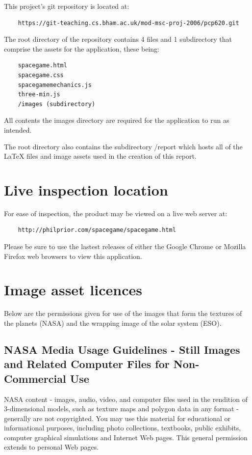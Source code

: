 \documentclass[twoside]{bhamthesis}
\begin{document}
This project's git repository is located at:
\begin{verbatim}
	https://git-teaching.cs.bham.ac.uk/mod-msc-proj-2006/pcp620.git
\end{verbatim}

\noindent
The root directory of the repository contains 4 files and 1 subdirectory that comprise the assets for the application, these being:

\begin{verbatim}
	spacegame.html
	spacegame.css
	spacegamemechanics.js
	three-min.js
	/images (subdirectory)
\end{verbatim}

\noindent
All contents the images directory are required for the application to run as intended.

\bigskip
\noindent
The root directory also contains the subdirectory /report which hosts all of the LaTeX files and image assets used in the creation of this report.


\section{Live inspection location}
For ease of inspection, the product may be viewed on a live web server at:
\begin{verbatim}
	http://philprior.com/spacegame/spacegame.html
\end{verbatim}
Please be sure to use the lastest releases of either the Google Chrome or Mozilla Firefox web browsers to view this application.

\newpage

\section{Image asset licences}

Below are the permissions given for use of the images that form the textures of the planets (NASA) and the wrapping image of the solar system (ESO).

\subsection{NASA Media Usage Guidelines - Still Images and Related Computer Files for Non-Commercial Use}

NASA content - images, audio, video, and computer files used in the rendition of 3-dimensional models, such as texture maps and polygon data in any format - generally are not copyrighted. You may use this material for educational or informational purposes, including photo collections, textbooks, public exhibits, computer graphical simulations and Internet Web pages. This general permission extends to personal Web pages.
\end{document}
